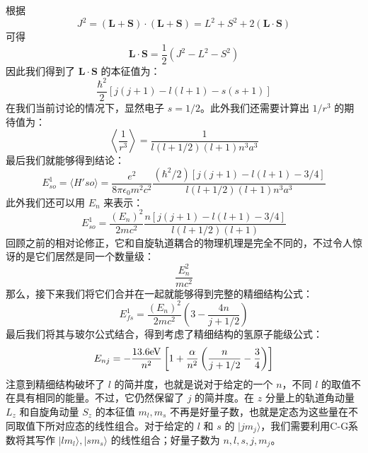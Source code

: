 根据
\begin{equation}
J^2 = (\mathbf{L+S})\cdot(\mathbf{L+S})=L^2+S^2+2(\mathbf{L\cdot S})
\end{equation}
可得
\begin{equation}
\mathbf{L\cdot S}=\frac{1}{2}(J^2-L^2-S^2)
\end{equation}
因此我们得到了 $\mathbf{L\cdot S}$ 的本征值为：
\begin{equation}
\frac{\hbar^2}{2}[j(j+1)-l(l+1)-s(s+1)]
\end{equation}
在我们当前讨论的情况下，显然电子 $s=1/2$。此外我们还需要计算出 $1/r^3$ 的期待值为：
\begin{equation}
\left\langle \frac{1}{r^3}\right\rangle = \frac{1}{l(l+1/2)(l+1)n^3a^3}
\end{equation}
最后我们就能够得到结论：
\begin{equation}
E^1_{so}=\langle H'{so}\rangle = \frac{e^2}{8\pi \epsilon_0 m^2 c^2}\frac{(\hbar^2/2)[j(j+1)-l(l+1)-3/4]}{l(l+1/2)(l+1)n^3a^3}
\end{equation}
此外我们还可以用 $E_n$ 来表示：
\begin{equation}
E^1_{so}=\frac{(E_n)^2}{2mc^2}\frac{n[j(j+1)-l(l+1)-3/4]}{l(l+1/2)(l+1)}
\end{equation}
回顾之前的相对论修正，它和自旋轨道耦合的物理机理是完全不同的，不过令人惊讶的是它们居然是同一个数量级：
\begin{equation}
\frac{E_n^2}{mc^2}
\end{equation}
那么，接下来我们将它们合并在一起就能够得到完整的精细结构公式：
\begin{equation}
E_{fs}^1=\frac{(E_n)^2}{2mc^2}\left(3-\frac{4n}{j+1/2}\right)
\end{equation}
最后我们将其与玻尔公式结合，得到考虑了精细结构的氢原子能级公式：
\begin{equation}
E_{nj}=-\frac{13.6\rm{eV}}{n^2}\left[1+\frac{\alpha}{n^2}\left(\frac{n}{j+1/2}-\frac{3}{4}\right)\right]
\end{equation}
注意到精细结构破坏了 $l$ 的简并度，也就是说对于给定的一个 $n$，不同 $l$ 的取值不在具有相同的能量。不过，它仍然保留了 $j$ 的简并度。在 $z$ 分量上的轨道角动量 $L_z$ 和自旋角动量 $S_z$ 的本征值 $m_l,m_s$ 不再是好量子数，也就是定态为这些量在不同取值下所对应态的线性组合。对于给定的 $l$ 和 $s$ 的 $|jm_j\rangle$，我们需要利用C-G系数将其写作 $|lm_l\rangle,|sm_s\rangle$ 的线性组合；好量子数为 $n,l,s,j,m_j$。





